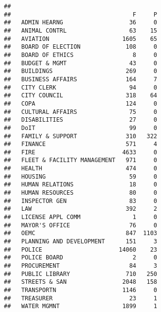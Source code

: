 \documentclass[]{book}
\newenvironment{Shaded}{\begin{snugshade}}{\end{snugshade}}
\newcommand{\KeywordTok}[1]{\textcolor[rgb]{0.13,0.29,0.53}{\textbf{#1}}}
\newcommand{\NormalTok}[1]{#1}
\newcommand{\OperatorTok}[1]{\textcolor[rgb]{0.81,0.36,0.00}{\textbf{#1}}}
\begin{document}
\begin{Shaded}
\end{Shaded}

\begin{verbatim}
##                              
##                                   F     P
##   ADMIN HEARNG                   36     0
##   ANIMAL CONTRL                  63    15
##   AVIATION                     1605    65
##   BOARD OF ELECTION             108     0
##   BOARD OF ETHICS                 8     0
##   BUDGET & MGMT                  43     0
##   BUILDINGS                     269     0
##   BUSINESS AFFAIRS              164     7
##   CITY CLERK                     94     0
##   CITY COUNCIL                  318    64
##   COPA                          124     0
##   CULTURAL AFFAIRS               75     0
##   DISABILITIES                   27     0
##   DoIT                           99     0
##   FAMILY & SUPPORT              310   322
##   FINANCE                       571     4
##   FIRE                         4633     0
##   FLEET & FACILITY MANAGEMENT   971     0
##   HEALTH                        474     0
##   HOUSING                        59     0
##   HUMAN RELATIONS                18     0
##   HUMAN RESOURCES                80     0
##   INSPECTOR GEN                  83     0
##   LAW                           392     2
##   LICENSE APPL COMM               1     0
##   MAYOR'S OFFICE                 76     0
##   OEMC                          847  1103
##   PLANNING AND DEVELOPMENT      151     3
##   POLICE                      14060    23
##   POLICE BOARD                    2     0
##   PROCUREMENT                    84     3
##   PUBLIC LIBRARY                710   250
##   STREETS & SAN                2048   158
##   TRANSPORTN                   1146     0
##   TREASURER                      23     1
##   WATER MGMNT                  1899     1
\end{verbatim}

\begin{Shaded}
\end{Shaded}
\end{document}
